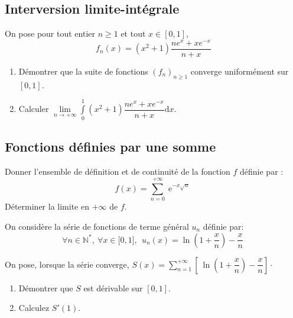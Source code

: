 \documentclass[a4paper,twoside,french,11pt]{VcCours}
\DeclareMathOperator{\e}{e}
\begin{document}
\medskip

\subsection{\large Interversion limite-intégrale}

\medskip


\begin{Exercice}{}On pose pour tout entier $n \geq 1$ et tout $x \in [0,1]$,
$$f_{n}\left( x\right) =\left( x^{2}+1\right) \dfrac{ne^{x}+xe^{-x}}{n+x} $$

\begin{enumerate}
\item Démontrer que la suite de fonctions $\left( f_{n}\right) _{n \geq 1}$ converge uniformément sur $[0,1]$.
\item Calculer $\underset{n\rightarrow +\infty }{\lim }\int\limits_{0}^{1}\left( x^{2}+1\right) \dfrac{ne^{x}+xe^{-x}}{n+x}\text{d}x$.
\end{enumerate}
\end{Exercice} 


\medskip

\subsection{\large Fonctions définies par une somme}

\medskip


\begin{Exercice}{} Donner l'ensemble de définition et de continuité de la fonction $f$ définie par :
  \[
  f(x) = \sum_{n = 0}^{ + \infty} \e^{ - x\sqrt n}
  \]
 Déterminer la limite en $ + \infty$ de $f$.
 \end{Exercice}
 

\begin{Exercice}{} On considère la série de fonctions de terme général $u_{n}$ définie par: 
\begin{equation*}
\forall n\in \mathbb{N}^{*},\ \forall x\in \lbrack 0,1], \ \ u_{n}\left(x\right) =\ln \left( 1+\dfrac{x}{n}\right) -\dfrac{x}{n}~
\end{equation*}

On pose, lorsque la série converge, $S(x)=\sum\limits_{n=1}^{+\infty }\left[ \ \ln \left( 1+\dfrac{x}{n}\right) -\dfrac{x}{n}\right] \cdot$

\begin{enumerate}
\item Démontrer que $S$ est dérivable sur $[0,1]$.
\item Calculez $S'(1)$.
\end{enumerate}
\end{Exercice}
\end{document}
